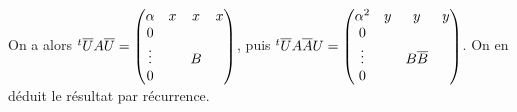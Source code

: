 {{\begin{enumerate}
On a alors $^t\overline UA\overline U=\begin{pmatrix}
\alpha  & x & x & x\cr
 0      &   &   &  \cr
\vdots  &   & B &  \cr
 0      &   &   &  \cr\end{pmatrix}$, 
puis
$^t\overline UA\overline AU=\begin{pmatrix}
\alpha ^2 & y & y             & y\cr
0         &   &               &  \cr
\vdots    &   & B \overline B &  \cr
0         &   &               &  \cr\end{pmatrix}$.
On en d\'eduit le r\'esultat par r\'ecurrence.
\end{enumerate}}
}